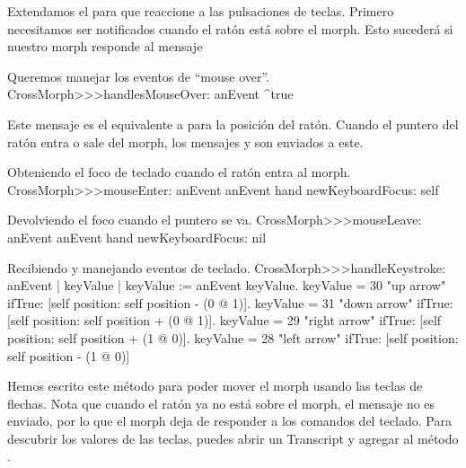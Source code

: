 \documentclass[a4paper,10pt,twoside]{book}
\begin{document}
Extendamos el  para que reaccione a las pulsaciones de teclas.
Primero necesitamos ser notificados cuando el rat\'on est\'a sobre el morph.
Esto suceder\'a si nuestro morph responde  al mensaje 

\begin{method}{Queremos manejar los eventos de ``mouse over''.} 
CrossMorph>>>handlesMouseOver: anEvent
	^true
\end{method}

\noindent
Este mensaje es el equivalente a  para la posici\'on del rat\'on.
Cuando el puntero del rat\'on entra o sale del morph, los mensajes  y  son enviados a este.

\begin{method}{Obteniendo el foco de teclado cuando el rat\'on entra al morph.}
CrossMorph>>>mouseEnter: anEvent
	anEvent hand newKeyboardFocus: self
\end{method}

\begin{method}{Devolviendo el foco cuando el puntero se va.}
CrossMorph>>>mouseLeave: anEvent
	anEvent hand newKeyboardFocus: nil
\end{method}

\begin{method}[handleKeystroke]{Recibiendo y manejando eventos de teclado.}
CrossMorph>>>handleKeystroke: anEvent
	| keyValue |
	keyValue := anEvent keyValue.
	keyValue = 30	 "up arrow"
		ifTrue: [self position: self position - (0 @ 1)].
	keyValue = 31	 "down arrow"
		ifTrue: [self position: self position + (0 @ 1)].
	keyValue = 29	 "right arrow"
		ifTrue: [self position: self position + (1 @ 0)].
	keyValue = 28	 "left arrow"
		ifTrue: [self position: self position - (1 @ 0)]
\end{method}

Hemos escrito este m\'etodo  para poder mover el morph usando las teclas de flechas.
Nota que cuando el rat\'on ya no est\'a sobre el morph, el mensaje  no es enviado, por lo que el morph deja de responder a los comandos del teclado.
Para descubrir los valores de las teclas, puedes abrir un Transcript y agregar   al método . 
\end{document}
